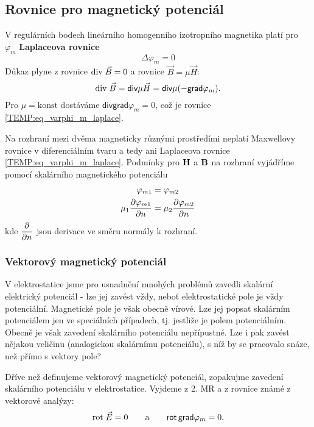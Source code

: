     \subsection{Rovnice pro magnetický potenciál}
      V regulárních bodech lineárního homogenního izotropního magnetika platí pro $\varphi_m$
      \textbf{Laplaceova rovnice}
      \begin{equation}\label{TEMP:eq_varphi_m_laplace}
        \Delta\varphi_m = 0
      \end{equation}      
      Důkaz plyne z rovnice $\mathrm{div}\;\vec{B} = 0$ a rovnice $\vec{B} = \mu\vec{H}$: $$\mathrm{div}\;\vec{B} =
      \textsf{div}\mu\vec{H} = \textsf{div}\mu(-\textsf{grad}\varphi_m).$$ Pro $\mu = \text{konst}$
      dostáváme $\textsf{div}\textsf{grad}\varphi_m = 0$, což je rovnice
      \ref{TEMP:eq_varphi_m_laplace}.
      
      Na rozhraní mezi dvěma magneticky různými prostředími neplatí Maxwellovy rovnice v
      diferenciálním tvaru a tedy ani Laplaceova rovnice \ref{TEMP:eq_varphi_m_laplace}. Podmínky 
      pro $\mathbf{H}$ a $\mathbf{B}$ na rozhraní vyjádříme pomocí skalárního magnetického potenciálu
       \begin{align}\label{TEMP:eq_mag_U_rozhrani}
         \varphi_{m1}                 &= \varphi_{m2} \\
         \mu_1\dfrac{\partial \varphi_{m1}}{\partial n}  &= \mu_2\dfrac{\partial \varphi_{m2}}{\partial n} 
       \end{align}
      kde $\dfrac{\partial }{\partial n}$ jsou derivace ve směru normály k rozhraní. 
    
    \subsubsection{Vektorový magnetický potenciál}
      V elektrostatice jsme pro usnadnění mnohých problémů zavedli skalární elektrický potenciál -
      lze jej zavést vždy, neboť elektrostatické pole je vždy potenciální. Magnetické pole je však
      obecně vírové. Lze jej popsat skalárním potenciálem jen ve speciálních případech, tj.
      jestliže je polem potenciálním. Obecně je však zavedení skalárního potenciálu nepřípustné.
      Lze i pak zavést nějakou veličinu (analogickou skalárnímu potenciálu), s níž by se pracovalo
      snáze, než přímo s vektory pole?
      
      Dříve než definujeme vektorový magnetický potenciál, zopakujme zavedení skalárního potenciálu
      v elektrostatice. Vyjdeme z 2. MR a z rovnice známé z vektorové analýzy: $$\mathrm{rot}\;\vec{E} = 0 \qquad
      \text{a} \qquad \textsf{rot}\,\textsf{grad}\varphi_m = 0.$$
      
